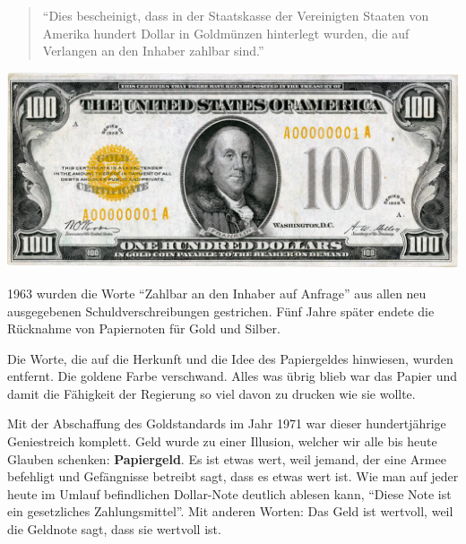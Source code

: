 \begin{quotation}\begin{samepage}
\enquote{Dies bescheinigt, dass in der Staatskasse der Vereinigten Staaten von
Amerika hundert Dollar in Goldmünzen hinterlegt wurden, die auf Verlangen an den
Inhaber zahlbar sind.}
\end{samepage}\end{quotation}

\begin{center}
  \centering
  \includegraphics[width=\textwidth]{assets/images/us-gold-cert-100-smaller.png}
  \label{fig:us-gold-cert-100-smaller}
\end{center}

1963 wurden die Worte \enquote{Zahlbar an den Inhaber auf Anfrage} aus allen neu
ausgegebenen Schuldverschreibungen gestrichen. Fünf Jahre später endete die
Rücknahme von Papiernoten für Gold und Silber.

Die Worte, die auf die Herkunft und die Idee des Papiergeldes hinwiesen, wurden
entfernt. Die goldene Farbe verschwand. Alles was übrig blieb war das Papier und
damit die Fähigkeit der Regierung so viel davon zu drucken wie sie wollte.

Mit der Abschaffung des Goldstandards im Jahr 1971 war dieser hundertjährige
Geniestreich komplett. Geld wurde zu einer Illusion, welcher wir alle bis heute
Glauben schenken: \textbf{Papiergeld}. Es ist etwas wert, weil jemand, der
eine Armee befehligt und Gefängnisse betreibt sagt, dass es etwas wert ist. Wie
man auf jeder heute im Umlauf befindlichen Dollar-Note deutlich ablesen kann,
\enquote{Diese Note ist ein gesetzliches Zahlungsmittel}. Mit anderen Worten:
Das Geld ist wertvoll, weil die Geldnote sagt, dass sie wertvoll ist.

